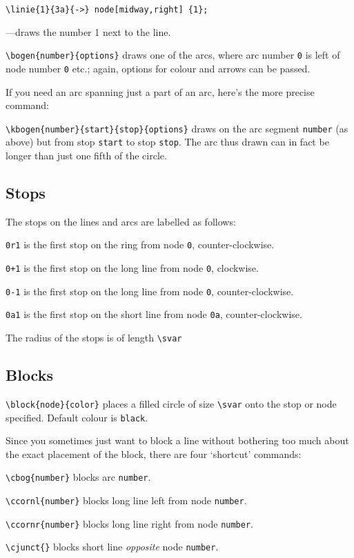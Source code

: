 \documentclass[a5paper]{scrartcl}
\begin{document}
\verb|\linie{1}{3a}{->} node[midway,right] {1};|

---draws the number 1 next to the line.

\verb|\bogen{number}{options}| draws one of the arcs, where arc number \verb|0| is left of node number \verb|0| etc.; again, options for colour and arrows can be passed. 

If you need an arc spanning just a part of an arc, here's the more precise command:

\verb|\kbogen{number}{start}{stop}{options}| draws on the arc segment \verb|number| (as above) but from stop \verb|start| to stop  \verb|stop|. The arc thus drawn can in fact be longer than just one fifth of the circle. 

\subsection*{Stops}

The stops on the lines and arcs are labelled as follows:

\verb|0r1| is the first stop on the ring from node \verb|0|, counter-clockwise.
    
\verb|0+1| is the first stop on the long line from node \verb|0|, clockwise.
    
\verb|0-1| is the first stop on the long line from node \verb|0|, counter-clockwise.
    
\verb|0a1| is the first stop on the short line from node \verb|0a|, counter-clockwise.

The radius of the stops is of length \verb|\svar|

\subsection*{Blocks}

\verb|\block{node}{color}| places a filled circle of size \verb|\svar| onto the stop or node specified. Default colour is \verb|black|.

Since you sometimes just want to block a line without bothering too much about the exact placement of the block, there are four `shortcut' commands:

\verb|\cbog{number}| blocks arc \verb|number|.

\verb|\ccornl{number}| blocks long line left from node  \verb|number|.

\verb|\ccornr{number}| blocks long line right from node  \verb|number|.

\verb|\cjunct{}| blocks short line \emph{opposite} node  \verb|number|.
\end{document}

